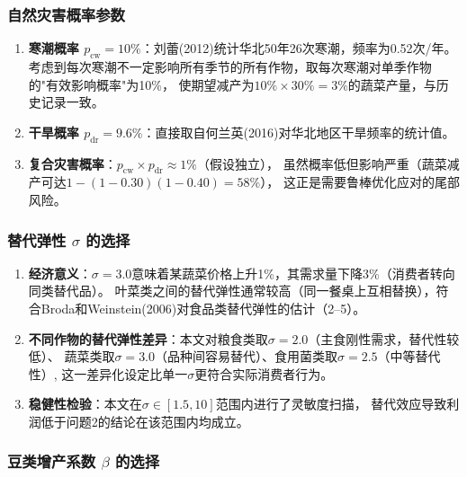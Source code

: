 \documentclass[12pt]{ctexart}
\begin{document}
\subsubsection{自然灾害概率参数}

\begin{enumerate}[label=(\arabic*), leftmargin=*]
    \item \textbf{寒潮概率 $p_{\text{cw}}=10\%$}：刘蕾(2012)统计华北50年26次寒潮，频率为0.52次/年。
          考虑到每次寒潮不一定影响所有季节的所有作物，取每次寒潮对单季作物的"有效影响概率"为10\%，
          使期望减产为$10\%\times30\%=3\%$的蔬菜产量，与历史记录一致。
    \item \textbf{干旱概率 $p_{\text{dr}}=9.6\%$}：直接取自何兰英(2016)对华北地区干旱频率的统计值。
    \item \textbf{复合灾害概率}：$p_{\text{cw}}\times p_{\text{dr}}\approx 1\%$（假设独立），
          虽然概率低但影响严重（蔬菜减产可达$1-(1-0.30)(1-0.40)=58\%$），
          这正是需要鲁棒优化应对的尾部风险。
\end{enumerate}

\subsubsection{\texorpdfstring{替代弹性 $\sigma$ 的选择}{替代弹性 sigma 的选择}}

\begin{enumerate}[label=(\arabic*), leftmargin=*]
    \item \textbf{经济意义}：$\sigma=3.0$意味着某蔬菜价格上升1\%，其需求量下降3\%（消费者转向同类替代品）。
          叶菜类之间的替代弹性通常较高（同一餐桌上互相替换），符合Broda和Weinstein(2006)对食品类替代弹性的估计（2--5）。
    \item \textbf{不同作物的替代弹性差异}：本文对粮食类取$\sigma=2.0$（主食刚性需求，替代性较低）、
          蔬菜类取$\sigma=3.0$（品种间容易替代）、食用菌类取$\sigma=2.5$（中等替代性）,
          这一差异化设定比单一$\sigma$更符合实际消费者行为。
    \item \textbf{稳健性检验}：本文在$\sigma\in[1.5, 10]$范围内进行了灵敏度扫描，
          替代效应导致利润低于问题2的结论在该范围内均成立。
\end{enumerate}

\subsubsection{\texorpdfstring{豆类增产系数 $\beta$ 的选择}{豆类增产系数 beta 的选择}}
\end{document}
